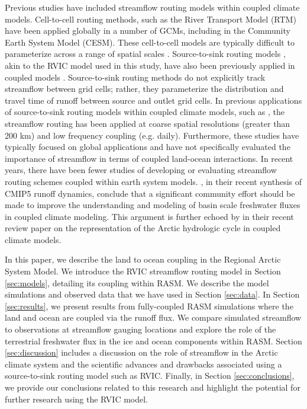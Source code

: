 \documentclass[jgrga, draft]{agutex}
\begin{document}
\begin{article}
Previous studies have included streamflow routing models within coupled climate models.
Cell-to-cell routing methods, such as the River Transport Model (RTM) \citep{Branstetter_2003} have been applied globally in a number of GCMs, including in the Community Earth System Model (CESM).
These cell-to-cell models are typically difficult to parameterize across a range of spatial scales \citep{Sushama_2004}.
Source-to-sink routing models \citep[e.g.][]{Lohmann_1996,Naden_1992}, akin to the RVIC model used in this study, have also been previously applied in coupled models \citep[e.g.][]{Olivera_2000}.
Source-to-sink routing methods do not explicitly track streamflow between grid cells; rather, they parameterize the distribution and travel time of runoff between source and outlet grid cells.
In previous applications of source-to-sink routing models within coupled climate models, such as \citet{Olivera_2000}, the streamflow routing has been applied at coarse spatial resolutions (greater than 200 km) and low frequency coupling (e.g. daily).
Furthermore, these studies have typically focused on global applications and have not specifically evaluated the importance of streamflow in terms of coupled land-ocean interactions.
In recent years, there have been fewer studies of developing or evaluating streamflow routing schemes coupled within earth system models.
\citet{Bring_2015}, in their recent synthesis of CMIP5 runoff dynamics, conclude that a significant community effort should be made to improve the understanding and modeling of basin scale freshwater fluxes in coupled climate modeling.
This argument is further echoed by \citet{Lique_2015} in their recent review paper on the representation of the Arctic hydrologic cycle in coupled climate models.

In this paper, we describe the land to ocean coupling in the Regional Arctic System Model.
We introduce the RVIC streamflow routing model in Section \ref{sec:models}, detailing its coupling within RASM.
We describe the model simulations and observed data that we have used in Section \ref{sec:data}.
In Section \ref{sec:results}, we present results from fully-coupled RASM simulations where the land and ocean are coupled via the runoff flux.
We compare simulated streamflow to observations at streamflow gauging locations and explore the role of the terrestrial freshwater flux in the ice and ocean components within RASM.
Section \ref{sec:discussion} includes a discussion on the role of streamflow in the Arctic climate system and the scientific advances and drawbacks associated using a source-to-sink routing model such as RVIC.
Finally, in Section \ref{sec:conclusions}, we provide our conclusions related to this research and highlight the potential for further research using the RVIC model.


\end{article}
\end{document}

